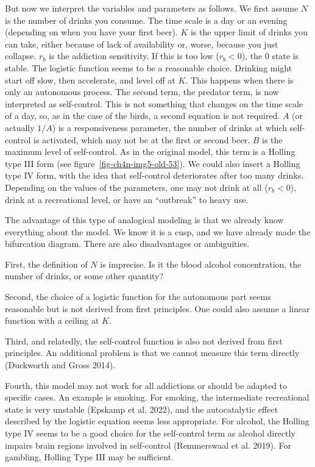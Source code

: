 \documentclass[
  a4paper,
  DIV=11,
  numbers=noendperiod,
  oneside]{scrreprt}
\begin{document}
But now we interpret the variables and parameters as follows. We first
assume \(N\) is the number of drinks you consume. The time scale is a
day or an evening (depending on when you have your first beer). \(K\) is
the upper limit of drinks you can take, either because of lack of
availability or, worse, because you just collapse. \(r_{b}\) is the
addiction sensitivity. If this is too low (\(r_{b} < 0\)), the 0 state
is stable. The logistic function seems to be a reasonable choice.
Drinking might start off slow, then accelerate, and level off at \(K\).
This happens when there is only an autonomous process. The second term,
the predator term, is now interpreted as self-control. This is not
something that changes on the time scale of a day, so, as in the case of
the birds, a second equation is not required. \(A\) (or actually
\(1/A\)) is a responsiveness parameter, the number of drinks at which
self-control is activated, which may not be at the first or second beer.
\(B\) is the maximum level of self-control. As in the original model,
this term is a Holling type III form (see
figure~\ref{fig-ch4n-img5-old-53}). We could also insert a Holling type
IV form, with the idea that self-control deteriorates after too many
drinks. Depending on the values of the parameters, one may not drink at
all (\(r_{b} < 0\)), drink at a recreational level, or have an
``outbreak'' to heavy use.

The advantage of this type of analogical modeling is that we already
know everything about the model. We know it is a cusp, and we have
already made the bifurcation diagram. There are also disadvantages or
ambiguities.

First, the definition of \(N\) is imprecise. Is it the blood alcohol
concentration, the number of drinks, or some other quantity?

Second, the choice of a logistic function for the autonomous part seems
reasonable but is not derived from first principles. One could also
assume a linear function with a ceiling at \(K\).

Third, and relatedly, the self-control function is also not derived from
first principles. An additional problem is that we cannot measure this
term directly (Duckworth and Gross 2014).

Fourth, this model may not work for all addictions or should be adapted
to specific cases. An example is smoking. For smoking, the intermediate
recreational state is very unstable (Epskamp et al. 2022), and the
autocatalytic effect described by the logistic equation seems less
appropriate. For alcohol, the Holling type IV seems to be a good choice
for the self-control term as alcohol directly impairs brain regions
involved in self-control (Remmerswaal et al. 2019). For gambling,
Holling Type III may be sufficient.
\end{document}
